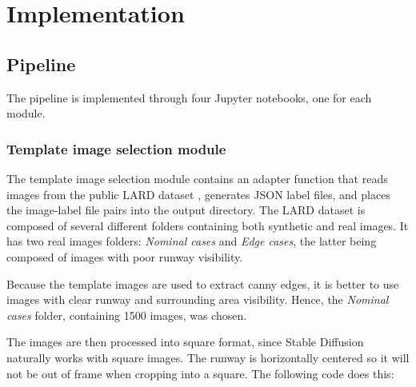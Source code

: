 \chapter{Implementation}




% 


\section{Pipeline}

The pipeline is implemented through four Jupyter notebooks, one for each module.

\subsection{Template image selection module}

The template image selection module contains an adapter function that reads images from the public LARD dataset \cite{ducoffe_lard_2023}, generates JSON label files, and places the image-label file pairs into the output directory. 
The LARD dataset is composed of several different folders containing both synthetic and real images. 
It has two real images folders: \emph{Nominal cases} and \emph{Edge cases}, the latter being composed of images with poor runway visibility.

Because the template images are used to extract canny edges, it is better to use images with clear runway and surrounding area visibility. 
Hence, the \emph{Nominal cases} folder, containing 1500 images, was chosen.

The images are then processed into square format, since Stable Diffusion naturally works with square images. 
The runway is horizontally centered so it will not be out of frame when cropping into a square. 
The following code does this:

